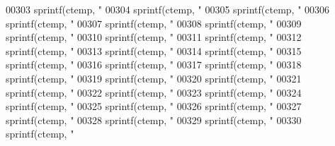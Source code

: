 \begin{DoxyCode}
{{{{{{{{{{{{{{{{{{{{{{{{{{{{{{{{{{{{{{{{{{{{{{{{{{{{{{{{{{{{{{{{{{{{{{{{{{{{{{{{{{{{{{{{{{{{{{{{{{{{{{{{{{{{{{{{{{{{{{{{{{{{{{{{{{{{{{{{{{{{{{{{{{{{{{{{{{{{{{{{{{{00303     sprintf(ctemp, \textcolor{stringliteral}{"%
00304     sprintf(ctemp, \textcolor{stringliteral}{"%
00305     sprintf(ctemp, \textcolor{stringliteral}{"%
00306     sprintf(ctemp, \textcolor{stringliteral}{"%
00307     sprintf(ctemp, \textcolor{stringliteral}{"%
00308     sprintf(ctemp, \textcolor{stringliteral}{"%
00309     sprintf(ctemp, \textcolor{stringliteral}{"%
00310     sprintf(ctemp, \textcolor{stringliteral}{"%
00311     sprintf(ctemp, \textcolor{stringliteral}{"%
00312     sprintf(ctemp, \textcolor{stringliteral}{"%
00313     sprintf(ctemp, \textcolor{stringliteral}{"%
00314     sprintf(ctemp, \textcolor{stringliteral}{"%
00315     sprintf(ctemp, \textcolor{stringliteral}{"%
00316     sprintf(ctemp, \textcolor{stringliteral}{"%
00317     sprintf(ctemp, \textcolor{stringliteral}{"%
00318     sprintf(ctemp, \textcolor{stringliteral}{"%
00319     sprintf(ctemp, \textcolor{stringliteral}{"%
00320     sprintf(ctemp, \textcolor{stringliteral}{"%
00321     sprintf(ctemp, \textcolor{stringliteral}{"%
00322     sprintf(ctemp, \textcolor{stringliteral}{"%
00323     sprintf(ctemp, \textcolor{stringliteral}{"%
00324     sprintf(ctemp, \textcolor{stringliteral}{"%
00325     sprintf(ctemp, \textcolor{stringliteral}{"%
00326     sprintf(ctemp, \textcolor{stringliteral}{"%
00327     sprintf(ctemp, \textcolor{stringliteral}{"%
00328     sprintf(ctemp, \textcolor{stringliteral}{"%
00329     sprintf(ctemp, \textcolor{stringliteral}{"%
00330     sprintf(ctemp, \textcolor{stringliteral}{"%
}}}}}}}}}}}}}}}}}}}}}}}}}}}}}}}}}}}}}}}}}}}}}}}}}}}}}}}}}}}}}}}}}}}}}}}}}}}}}}}}}}}}}}}}}}}}}}}}}}}}}}}}}}}}}}}}}}}}}}}}}}}}}}}}}}}}}}}}}}}}}}}}}}}}}}}}}}}}}}}}}}}}}}}}}}}}}}}}}}}}}}}}}}}}}}}
\end{DoxyCode}

